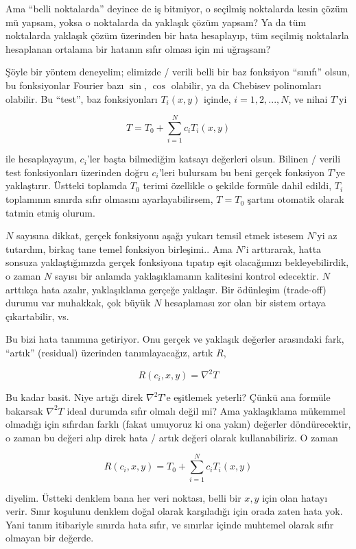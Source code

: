 \documentclass[12pt,fleqn]{article}\usepackage{../../common}
\begin{document}
Ama ``belli noktalarda'' deyince de iş bitmiyor, o seçilmiş noktalarda kesin
çözüm mü yapsam, yoksa o noktalarda da yaklaşık çözüm yapsam? Ya da tüm
noktalarda yaklaşık çözüm üzerinden bir hata hesaplayıp, tüm seçilmiş noktalarla
hesaplanan ortalama bir hatanın sıfır olması için mi uğraşsam?

Şöyle bir yöntem deneyelim; elimizde / verili belli bir baz fonksiyon ``sınıfı''
olsun, bu fonksiyonlar Fourier bazı $\sin$, $\cos$ olabilir, ya da Chebisev
polinomları olabilir. Bu ``test'', baz fonksiyonları $T_i(x,y)$ içinde,
$i=1,2,...,N$, ve nihai $T$'yi

$$
T = T_0 + \sum _{i=1}^{N} c_i T_i(x,y)
$$

ile hesaplayayım, $c_i$'ler başta bilmediğim katsayı değerleri olsun. Bilinen /
verili test fonksiyonları üzerinden doğru $c_i$'leri bulursam bu beni gerçek
fonksiyon $T$'ye yaklaştırır. Üstteki toplamda $T_0$ terimi özellikle o şekilde
formüle dahil edildi, $T_i$ toplamının sınırda sıfır olmasını ayarlayabilirsem,
$T=T_0$ şartını otomatik olarak tatmin etmiş olurum.

$N$ sayısına dikkat, gerçek fonksiyonu aşağı yukarı temsil etmek istesem $N$'yi
az tutardım, birkaç tane temel fonksiyon birleşimi.. Ama $N$'i arttırarak, hatta
sonsuza yaklaştığımızda gerçek fonksiyona tıpatıp eşit olacağımızı
bekleyebilirdik, o zaman $N$ sayısı bir anlamda yaklaşıklamanın kalitesini
kontrol edecektir. $N$ arttıkça hata azalır, yaklaşıklama gerçeğe yaklaşır.
Bir ödünleşim (trade-off) durumu var muhakkak, çok büyük $N$ hesaplaması zor
olan bir sistem ortaya çıkartabilir, vs.

Bu bizi hata tanımına getiriyor. Onu gerçek ve yaklaşık değerler arasındaki
fark, ``artık'' (residual) üzerinden tanımlayacağız, artık $R$,

$$
R(c_i,x,y) = \nabla^2 T
$$

Bu kadar basit. Niye artığı direk $\nabla^2 T$'e eşitlemek yeterli? Çünkü ana
formüle bakarsak $\nabla^2 T$ ideal durumda sıfır olmalı değil mi?  Ama
yaklaşıklama mükemmel olmadığı için sıfırdan farklı (fakat umuyoruz ki ona
yakın) değerler döndürecektir, o zaman bu değeri alıp direk hata / artık değeri
olarak kullanabiliriz. O zaman

$$
R(c_i,x,y) = T_0 + \sum _{i=1}^{N} c_i T_i(x,y)
$$

diyelim. Üstteki denklem bana her veri noktası, belli bir $x,y$ için olan hatayı
verir. Sınır koşulunu denklem doğal olarak karşıladığı için orada zaten hata
yok. Yani tanım itibariyle sınırda hata sıfır, ve sınırlar içinde muhtemel
olarak sıfır olmayan bir değerde.
\end{document}
